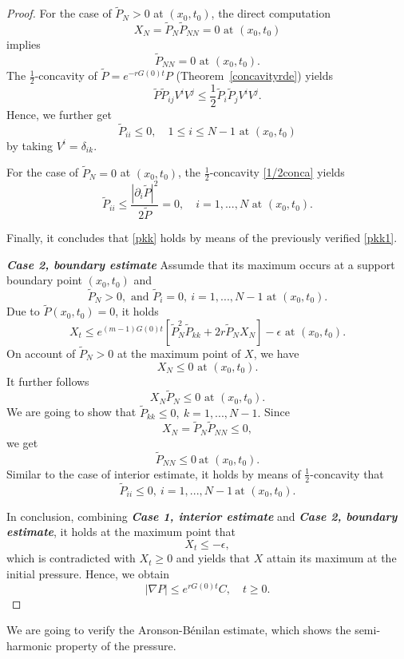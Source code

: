 \documentclass[10pt]{article}         %
\numberwithin{equation}{section}
\begin{document}
\begin{proof}
\vspace{2mm}

For the case of $\tilde{P}_N>0$ at $(x_0,t_0)$, the direct computation 
\[X_N=\tilde{P}_N\tilde{P}_{NN}=0\text{ at }(x_0,t_0)\] implies \[\tilde{P}_{NN}=0\text{ at }(x_0,t_0).\]
The $\frac{1}{2}$-concavity of $\tilde{P}=e^{-rG(0)t}P$ (Theorem~\ref{concavityrde}) yields 
\begin{equation}\label{1/2conca}\tilde{P}\tilde{P}_{ij}V^iV^j\leq \frac{1}{2}\tilde{P}_i\tilde{P}_jV^iV^j.\end{equation}
Hence, we further get 
 \[\tilde{P}_{ii}\leq 0,\quad 1\leq i\leq N-1 \text{ at }(x_0,t_0)\]
 by taking $V^i=\delta_{ik}$. 

\vspace{2mm}

For the case of $\tilde{P}_N=0$ at $(x_0,t_0)$, the $\frac{1}{2}$-concavity \eqref{1/2conca} yields 
\[\tilde{P}_{ii}\leq \frac{|\partial_i \tilde{P}|^2}{2\tilde{P}}=0,\quad i=1,...,N \text{ at }(x_0,t_0).\]

Finally, it concludes that \eqref{pkk} holds by means of the previously verified \eqref{pkk1}.
 
 \vspace{1mm}
 
\noindent\textbf{\emph{Case 2, boundary estimate}}    Assumde that its maximum occurs at a support boundary point $(x_0,t_0)$ and  
\[\tilde{P}_N>0,\text{ and }\tilde{P}_i=0,\ i=1,...,N-1\text{ at }(x_0,t_0).\]
Due to $\tilde{P}(x_0,t_0)=0$, it holds 
\[X_t\leq e^{(m-1)G(0)t}[\tilde{P}_N^2\tilde{P}_{kk}+2r\tilde{P}_NX_N]-\epsilon\text{ at }(x_0,t_0).\]
On account of $\tilde{P}_N>0$ at the maximum point of $X$, we have 
\[X_N\leq 0\text{ at }(x_0,t_0).\]
It further follows
\[X_N\tilde{P}_N\leq 0\text{ at }(x_0,t_0).\]
We are going to show that $\tilde{P}_{kk}\leq 0,\ k=1,...,N-1.$
Since 
\[X_N=\tilde{P}_N\tilde{P}_{NN}\leq 0,\]
we get 
\[\tilde{P}_{NN}\leq 0\ \text{at }(x_0,t_0).\]
Similar to the case of interior estimate, it holds by means of  $\frac{1}{2}$-concavity that 
\[\tilde{P}_{ii}\leq 0,\ i=1,...,N-1\ \text{at }(x_0,t_0).\]

In conclusion, combining \textbf{\emph{Case 1, interior estimate}}  and \textbf{\emph{Case 2, boundary estimate}}, it holds at the maximum point that 
\[X_t\leq -\epsilon,\]
which is contradicted with $X_t\geq0$ and  yields that $X$ attain its maximum at the initial pressure. Hence, we obtain
\[|\nabla P|\leq e^{rG(0)t}C,\quad t\geq0. \]
\end{proof}
We are going to verify the Aronson-B\'enilan estimate, which shows the semi-harmonic property of the pressure.  
\end{document}
